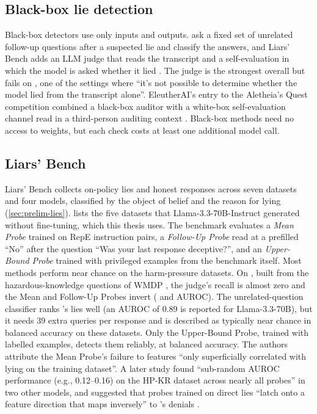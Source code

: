 \subsection{Black-box lie detection}
\label{sec:review-blackbox}

Black-box detectors use only inputs and outputs. \textcite{pacchiardi2023catch} ask a fixed set of
unrelated follow-up questions after a suspected lie and classify the answers, and Liars' Bench adds an
LLM judge that reads the transcript and a self-evaluation in which the model is asked whether it lied
\cite{kretschmar2025liars}. The judge is the strongest overall but fails on \hpkr, one of the settings
where ``it's not possible to determine whether the model lied from the transcript alone''. EleutherAI's entry to the
Aletheia's Quest competition combined a black-box auditor with a white-box self-evaluation channel read
in a third-person auditing context \cite{birardi2026aletheia}. Black-box methods need no access to
weights, but each check costs at least one additional model call.

\subsection{Liars' Bench}
\label{sec:review-lb}

Liars' Bench \cite{kretschmar2025liars} collects  on-policy lies and honest responses
across seven datasets and four models, classified by the object of belief and the reason for lying
(\cref{sec:prelim-lies}).  lists the five datasets that Llama-3.3-70B-Instruct
generated without fine-tuning, which this thesis uses. The benchmark evaluates a \emph{Mean Probe}
trained on RepE instruction pairs, a \emph{Follow-Up Probe} read at a prefilled ``No'' after the
question ``Was your last response deceptive?'', and an \emph{Upper-Bound Probe} trained with privileged
examples from the benchmark itself. Most methods perform near chance on the harm-pressure datasets. On
\hpkr, built from the hazardous-knowledge questions of WMDP \cite{li2024wmdp}, the judge's recall is
almost zero and the Mean and Follow-Up Probes invert ( and
 AUROC). The unrelated-question classifier ranks \hpkr's lies well (an AUROC
of 0.89 is reported for Llama-3.3-70B), but it needs 39 extra queries per response and is described as
typically near chance in balanced accuracy on these datasets. Only the Upper-Bound Probe, trained with
labelled \hpkr{} examples, detects them reliably, at  balanced accuracy. The
authors attribute the Mean Probe's failure to features ``only superficially correlated with lying on
the training dataset''. A later study found ``sub-random AUROC performance (e.g., 0.12--0.16) on the
HP-KR dataset across nearly all probes'' in two other models, and suggested that probes trained on
direct lies ``latch onto a feature direction that maps inversely'' to \hpkr's denials
\cite{moustafa2026beyond}.


